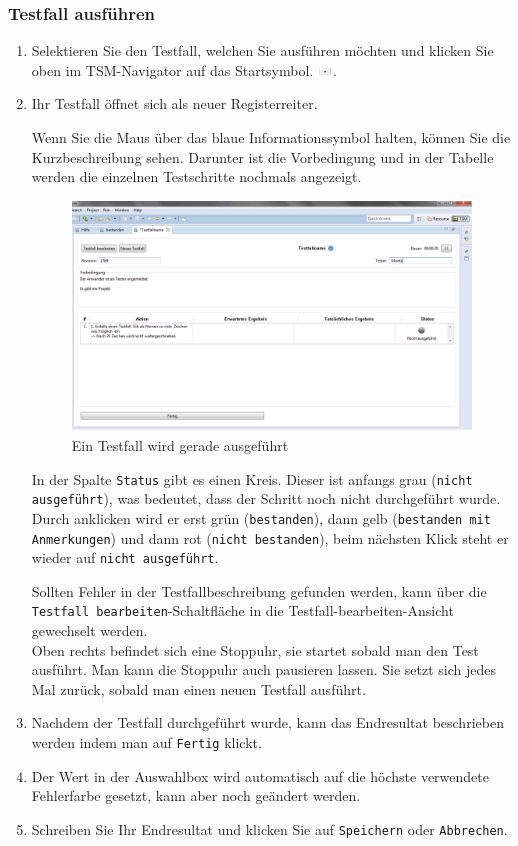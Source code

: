 \documentclass[11pt,a4paper,titlepage]{article}
\begin{document}
\subsubsection{Testfall ausführen}
\begin{enumerate}
\item Selektieren Sie den Testfall, welchen Sie ausführen möchten und klicken Sie oben im TSM-Navigator auf das Startsymbol.
\includegraphics[width= 15px]{BilderHandbuchTSMNavigator/Testfall/Play.png}.
\item Ihr Testfall öffnet sich als neuer Registerreiter.

Wenn Sie die Maus über das blaue Informationssymbol halten, können Sie die Kurzbeschreibung sehen.
Darunter ist die Vorbedingung und in der Tabelle werden die einzelnen Testschritte nochmals angezeigt.


\begin{figure}[H]
\centering
\includegraphics[width= 470px]{BilderHandbuch/Testfall/Ausfuehren.png}
\caption{Ein Testfall wird gerade ausgeführt}
\label{fig:Ausfuehren}
\end{figure}

In der Spalte \texttt{Status} gibt es einen Kreis.
Dieser ist anfangs grau (\texttt{nicht ausgeführt}), was bedeutet, dass der Schritt noch nicht durchgeführt wurde. Durch anklicken wird er erst grün (\texttt{bestanden}), 
dann gelb (\texttt{bestanden mit Anmerkungen}) und dann rot (\texttt{nicht bestanden}), beim nächsten Klick steht er wieder auf \texttt{nicht ausgeführt}.

Sollten Fehler in der Testfallbeschreibung gefunden werden, kann über die \texttt{Testfall bearbeiten}-Schaltfläche in die Testfall-bearbeiten-Ansicht gewechselt werden. \\
Oben rechts befindet sich eine Stoppuhr, sie startet sobald man den Test ausführt. Man kann die Stoppuhr auch pausieren lassen. Sie setzt sich jedes Mal zurück, sobald man einen neuen Testfall ausführt.

\item Nachdem der Testfall durchgeführt wurde, kann das Endresultat beschrieben werden indem man auf \texttt{Fertig} klickt.
\item Der Wert in der Auswahlbox wird automatisch auf die höchste verwendete Fehlerfarbe gesetzt, kann aber noch geändert werden.
\item Schreiben Sie Ihr Endresultat und klicken Sie auf \texttt{Speichern} oder \texttt{Abbrechen}.
\end{enumerate}
\end{document}
